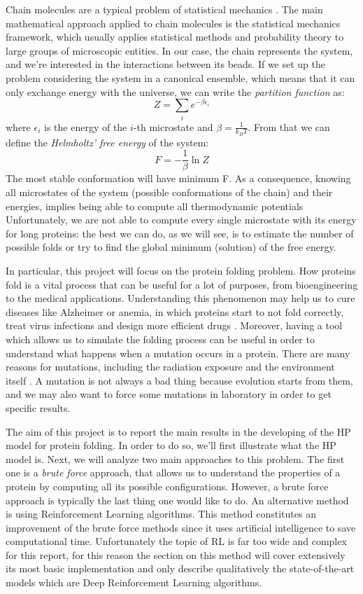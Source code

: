 Chain molecules are a typical problem of statistical mechanics \cite{statisticalmechanics}.
The main mathematical approach applied to chain molecules is the statistical mechanics framework, which usually applies statistical methods and probability theory to large groups of microscopic entities.
In our case, the chain represents the system, and we're interested in the interactions between its beads.
If we set up the problem considering the system in a canonical ensemble, which means that it can only exchange energy with the universe, we can write the \emph{partition function} as:
\begin{equation*}
    Z = \sum_i e^{-\beta\epsilon_i}
\end{equation*}
where $\epsilon_i$ is the energy of the $i$-th microstate and $\beta = \frac{1}{k_BT}$.
From that we can define the \emph{Helmholtz' free energy} of the system:
\begin{equation*}
    F = -\frac{1}{\beta} \ln Z
\end{equation*}
The most stable conformation will have minimum F.
As a consequence, knowing all microstates of the system (possible conformations of the chain) and their energies, implies being able to compute all thermodynamic potentials
Unfortunately, we are not able to compute every single microstate with its energy for long proteins: the best we can do, as we will see, is to estimate the number of possible folds or try to find the global minimum (solution) of the free energy.

In particular, this project will focus on the protein folding problem.
How proteins fold is a vital process that can be useful for a lot of purposes, from bioengineering to the medical applications.
Understanding this phenomenon may help us to cure diseases like Alzheimer or anemia, in which proteins start to not fold correctly, treat virus infections and design more efficient drugs \cite{PERM}. 
Moreover, having a tool which allows us to simulate the folding process can be useful in order to understand what happens when a mutation occurs in a protein.
There are many reasons for mutations, including the radiation exposure and the environment itself \cite{zanichelli}.
A mutation is not always a bad thing because evolution starts from them, and we may also want to force some mutations in laboratory in order to get specific results.

The aim of this project is to report the main results in the developing of the HP model for protein folding.
In order to do so, we'll first illustrate what the HP model is.
Next, we will analyze two main approaches to this problem.
The first one is a \emph{brute force} approach, that allows us to understand the properties of a protein by computing all its possible configurations.
However, a brute force approach is typically the last thing one would like to do.
An alternative method is using Reinforcement Learning algorithms.
This method constitutes an improvement of the brute force methods since it uses artificial intelligence to save computational time. 
Unfortunately the topic of RL is far too wide and complex for this report, for this reason the section on this method will cover extensively its most basic implementation and only describe qualitatively the state-of-the-art models which are Deep Reinforcement Learning algorithms.
